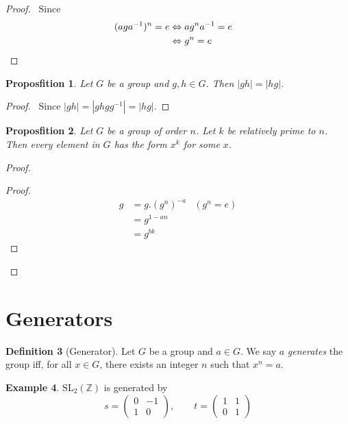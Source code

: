 \documentclass{book}
\let\qed\relax
\newtheorem{prop}{Proposfition}[chapter]
\theoremstyle{definition}
\newtheorem{df}[prop]{Definition}
\newtheorem{ex}[prop]{Example}
\newcommand{\inv}[1]{\ensuremath{{#1}^{-1}}}
\begin{document}
\begin{proof}
    \pf\ Since
    \begin{align*}
        (ag\inv{a})^n = e & \Leftrightarrow a g^n \inv{a} = e        \\
                          & \Leftrightarrow g^n = e           & \qed
    \end{align*}
\end{proof}

\begin{prop}
    Let $G$ be a group and $g,h \in G$. Then $|gh| = |hg|$.
\end{prop}

\begin{proof}
    \pf\ Since $|gh| = |ghg\inv{g}| = |hg|$. \qed
\end{proof}

\begin{prop}
Let $G$ be a group of order $n$. Let $k$ be relatively prime to $n$. Then every element in $G$ has the form $x^k$ for some $x$.
\end{prop}

\begin{proof}
\begin{proof}
\pf
\begin{align*}
g & = g. (g^n)^{-a} & (g^n = e) \\
& = g^{1-an} \\
& = g^{bk}
\end{align*}
\end{proof}
\qed
\end{proof}

\section{Generators}

\begin{df}[Generator]
    Let $G$ be a group and $a \in G$. We say $a$ \emph{generates} the group iff, for all $x \in G$, there exists an integer $n$ such that $x^n = a$.
\end{df}

\begin{ex}
\label{ex:SL2Z}
$\mathrm{SL}_2(\mathbb{Z})$ is generated by
\[ s = \left( \begin{array}{cc}
0 & -1 \\ 1 & 0
\end{array} \right), \qquad
t = \left( \begin{array}{cc}
1 & 1 \\
0 & 1
\end{array} \right) \]
\end{ex}
\end{document}
